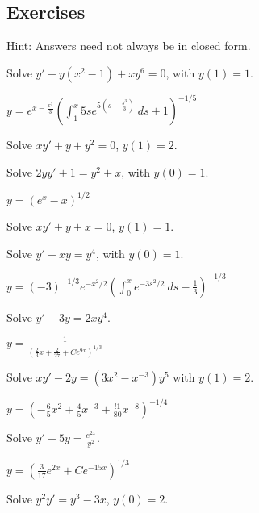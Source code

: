 \subsection{Exercises}

Hint: Answers need not always be in closed form.

\begin{exercise}
Solve
$y'+ y(x^2-1)+xy^6 = 0$, with $y(1)=1$.
\end{exercise}
\comboSol{%
}
{%
$y = e^{x - \frac{x^3}{3}}\left(\int_1^x 5se^{5(s - \frac{s^3}{3})}\ ds + 1 \right)^{-1/5}$
}

\begin{exercise}\ansMark%
Solve $xy'+y+y^2 = 0$, $y(1)=2$.
\end{exercise}

\begin{exercise}
Solve $2yy' + 1 = y^2 + x$, with $y(0)=1$.
\end{exercise}
\comboSol{%
}
{%
$y = (e^x - x)^{1/2}$
}

\begin{exercise}\ansMark%
Solve $xy'+y +x = 0$, $y(1)=1$.
\end{exercise}

\begin{exercise}
Solve $y' + xy = y^4$, with $y(0)=1$.
\end{exercise}
\comboSol{%
}
{%
$y = (-3)^{-1/3}e^{-x^2/2}\left(\int_0^x e^{-3s^2/2}\ ds - \frac{1}{3} \right)^{-1/3}$
}

\begin{exercise}
Solve $y' + 3y = 2xy^4$.
\end{exercise}
\comboSol{%
}
{%
$y = \frac{1}{\left( \frac{2}{3}x + \frac{2}{27} + Ce^{9x}\right)^{1/3}}$
}

\begin{exercise}
Solve $xy' - 2y = (3x^2 - x^{-3})y^5$ with $y(1) = 2$. 
\end{exercise}
\comboSol{%
}
{%
$y = \left( -\frac{6}{5}x^2 + \frac{4}{5}x^{-3} + \frac{!1}{80}x^{-8} \right)^{-1/4}$
}

\begin{exercise}
Solve $y' + 5y = \frac{e^{2x}}{y^2}$.
\end{exercise}
\comboSol{%
}
{%
$y = \left( \frac{3}{17}e^{2x} + Ce^{-15x} \right)^{1/3}$
}

\begin{exercise}\ansMark%
Solve $y^2y' = y^3-3x$, $y(0)=2$.
\end{exercise}

